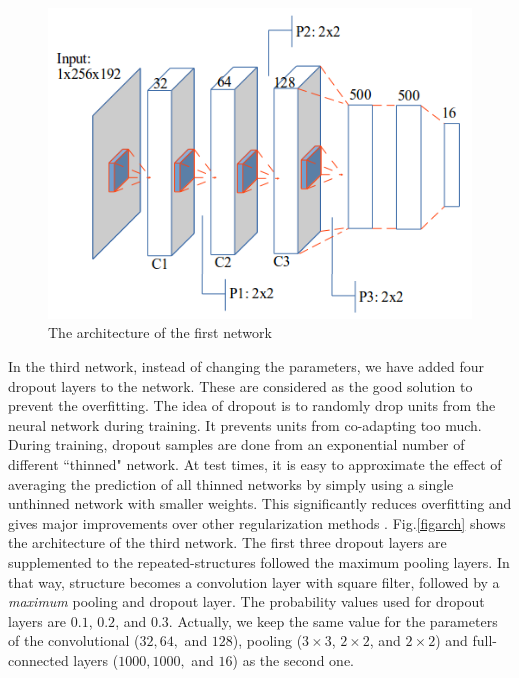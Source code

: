 \documentclass[conference]{IEEEtran}
\begin{document}
\begin{figure}[htbp]
	\centerline{\includegraphics[scale=0.45]{images/architecture1}}
	\caption{The architecture of the first network}
	\label{figarch0}
\end{figure}

In the third network, instead of changing the parameters, we have added four dropout layers to the network. These are considered as the good solution to prevent the overfitting. The idea of dropout is to randomly drop units from the neural network during training. It prevents units from co-adapting too much. During training, dropout samples are done from an exponential number of different ``thinned" network. At test times, it is easy to approximate the effect of averaging the prediction of all thinned networks by simply using a single unthinned network with smaller weights. This significantly reduces overfitting and gives major improvements over other regularization methods \cite{srivastava2014dropout}. Fig.\ref{figarch} shows the architecture of the third network. The first three dropout layers are supplemented to the repeated-structures followed the maximum pooling layers. In that way, structure becomes a convolution layer with square filter, followed by a \textit{maximum} pooling and dropout layer. The probability values used for dropout layers are $0.1$, $0.2$, and $0.3$. Actually, we keep the same value for the parameters of the convolutional ($32, 64,$ and $128$), pooling ($3 \times 3$, $2 \times 2$, and $2 \times 2$) and full-connected layers ($1000, 1000,$ and $16$) as the second one.
\end{document}
